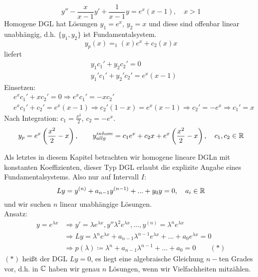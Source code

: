  \begin{beispiel}
 	\[ y''-\frac{x}{x-1}y'+\frac{1}{x-1}y=e^x(x-1),\quad x>1 \]
 	Homogene DGL hat L\"osungen $ y_1=e^x $, $ y_2=x $ und diese sind offenbar linear unabh\"angig, d.h. $ \lbrace y_1,y_2\rbrace $ ist Fundamentalsystem.
 	\[ y_p(x)=_1(x)e^x+c_2(x) x \]
 	liefert
 	\begin{align*}
 	&y_1c_1'+y_2c_2'=0\\&y_1'c_1'+y_2'c_2'=e^x(x-1)
 	\end{align*}
 	Einsetzen:
 	\begin{align*}
 	&e^xc_1'+xc_2'=0\Rightarrow e^xc_1'=-xc_2'\\
 	&e^xc_1'+c_2'=e^x(x-1)\Rightarrow c_2'(1-x)=e^x(x-1)\Rightarrow c_2'=-e^x\Rightarrow c_1'=x
 	\end{align*}
 	Nach Integration: $ c_1=\frac{x^2}{2} $, $ c_2=-e^x $.
 	\[ y_p=e^x\left(\frac{x^2}{2}-x\right),\qquad y_{allg}^{inhom}=c_1e^x+c_2x+e^x\left(\frac{x^2}{2}-x\right),\quad c_1,c_2\in\mathbb{R} \]
 \end{beispiel}
 Als letztes in diesem Kapitel betrachten wir homogene lineare DGLn mit konstanten Koeffizienten, dieser Typ DGL erlaubt die explizite Angabe eines Fundamentalsystems. Also nur auf Intervall $ I $:
 \[ Ly=y^{(n)}+a_{n-1}y^{(n-1)}+...+y_0 y=0,\quad a_i\in\mathbb{R} \]
 und wir suchen $ n $ linear unabh\"angige L\"osungen.\\
 Ansatz: \begin{align*} y=e^{\lambda x}&\Rightarrow y'=\lambda e^{\lambda x}, y''\lambda^2 e^{\lambda x},..., y^{(n)}=\lambda^n e^{\lambda x}\\
 &\Rightarrow Ly=\lambda^n e^{\lambda x}+a_{n-1}\lambda^{n-1}e^{\lambda x}+...+a_0e^{\lambda x}=0\\
 &\Rightarrow p(\lambda)\coloneqq\lambda^n+a_{n-1}\lambda^{n-1}+...+a_0=0\qquad(\ast) \end{align*}
 $ (\ast) $ hei\ss t  der DGL $ Ly=0 $, es liegt eine algebraische Gleichung $ n- $ten Grades vor, d.h. in $ \mathbb{C} $ haben wir genau $ n $ L\"osungen, wenn wir Vielfachheiten mitz\"ahlen.
